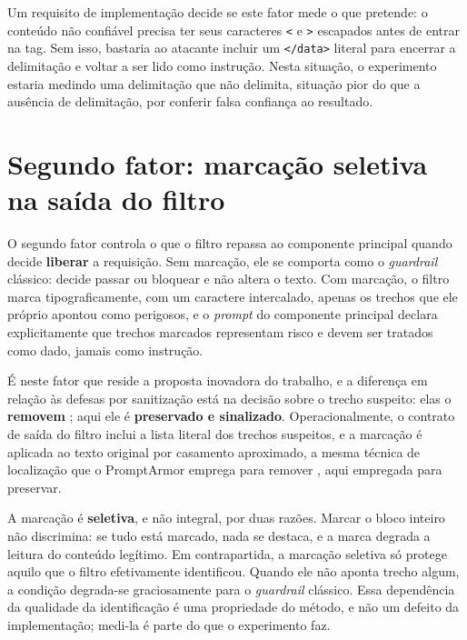 Um requisito de implementação decide se este fator mede o que pretende: o
conteúdo não confiável precisa ter seus caracteres \texttt{<} e \texttt{>}
escapados antes de entrar na tag. Sem isso, bastaria ao atacante incluir um
\texttt{</data>} literal para encerrar a delimitação e voltar a ser lido como
instrução. Nesta situação, o experimento estaria medindo uma delimitação que não delimita,
situação pior do que a ausência de delimitação, por conferir falsa confiança ao
resultado.

\section{Segundo fator: marcação seletiva na saída do filtro}\label{sec:fator2}

O segundo fator controla o que o filtro repassa ao componente principal quando
decide \textbf{liberar} a requisição. Sem marcação, ele se comporta como o
\textit{guardrail} clássico: decide passar ou bloquear e não altera o texto. Com
marcação, o filtro marca tipograficamente, com um caractere intercalado, apenas
os trechos que ele próprio apontou como perigosos, e o \textit{prompt} do
componente principal declara explicitamente que trechos marcados representam
risco e devem ser tratados como dado, jamais como instrução.

É neste fator que reside a proposta inovadora do trabalho, e a diferença em relação às
defesas por sanitização está na decisão sobre o trecho suspeito: elas o
\textbf{removem} \cite{shi2025promptarmor, wang2025datafilter, geng2025pisanitizer};
aqui ele é \textbf{preservado e sinalizado}. Operacionalmente, o contrato de
saída do filtro inclui a lista literal dos trechos suspeitos, e a marcação é
aplicada ao texto original por casamento aproximado, a mesma técnica de
localização que o PromptArmor emprega para remover \cite{shi2025promptarmor},
aqui empregada para preservar.

A marcação é \textbf{seletiva}, e não integral, por duas razões. Marcar o bloco
inteiro não discrimina: se tudo está marcado, nada se destaca, e a marca degrada
a leitura do conteúdo legítimo. Em contrapartida, a marcação seletiva só protege
aquilo que o filtro efetivamente identificou. Quando ele não aponta trecho
algum, a condição degrada-se graciosamente para o \textit{guardrail} clássico.
Essa dependência da qualidade da identificação é uma propriedade do método, e
não um defeito da implementação; medi-la é parte do que o experimento faz.

